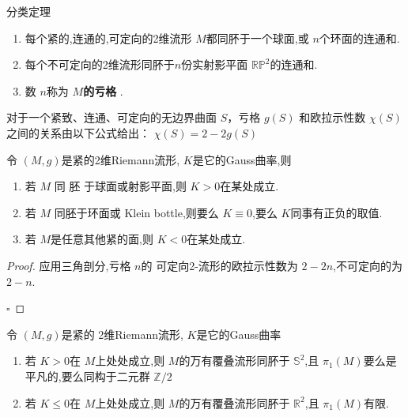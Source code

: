 \documentclass[../../main.tex]{subfiles}
\begin{document}
\begin{theorem}{分类定理}
    \begin{enumerate}
        \item  每个紧的,连通的,可定向的2维流形 \(  M  \)都同肧于一个球面,或 \(  n  \)个环面的连通和.
        \item     每个不可定向的2维流形同肧于\(  n  \)份实射影平面 \(  \mathbb{R} \mathbb{P}^{2}  \)的连通和.  
        \item 数 \(  n  \)称为 \textbf{\(  M  \)的亏格 }. 
       \end{enumerate}
\end{theorem}
\begin{proposition}
    对于一个紧致、连通、可定向的无边界曲面 $S$，亏格 $g(S)$ 和欧拉示性数 $\chi(S)$ 之间的关系由以下公式给出：
$\chi(S) = 2 - 2g(S)$
\end{proposition}
\begin{corollary}
    令 \(  \left( M,g \right)   \)是紧的2维Riemann流形, \(  K  \)是它的Gauss曲率,则
    \begin{enumerate}
        \item 若 \(  M  \) 同 胚 于球面或射影平面,则 \(K> 0    \)在某处成立.
        \item 若 \(  M  \) 同胚于环面或 Klein bottle,则要么 \(  K\equiv 0  \),要么 \(  K  \)同事有正负的取值.
        \item 若 \(  M  \)是任意其他紧的面,则 \(  K<0  \)在某处成立.    
    \end{enumerate}
      
\end{corollary}
\begin{proof}
    应用三角剖分,亏格 \(  n  \)的 可定向2-流形的欧拉示性数为 \(  2-2n  \),不可定向的为 \(  2-n  \).  

    \hfill $\square$
\end{proof}

\begin{corollary}
    令 \(  \left( M,g \right)   \)是紧的 2维Riemann流形, \(  K  \)是它的Gauss曲率
    \begin{enumerate}
        \item 若 \(  K> 0  \)在 \(  M  \)上处处成立,则 \(  M  \)的万有覆叠流形同肧于 \(  \mathbb{S}^{2}  \),且 \(  \pi _1 \left( M \right)   \)要么是平凡的,要么同构于二元群 \(  \mathbb{Z} /2  \) 
        \item 若 \(  K\le 0  \)在 \(  M  \)上处处成立,则 \(  M  \)的万有覆叠流形同肧于 \(  \mathbb{R} ^{2}  \),且 \(  \pi _1 \left( M \right)   \)有限.          
    \end{enumerate}
      
\end{corollary}
\end{document}
